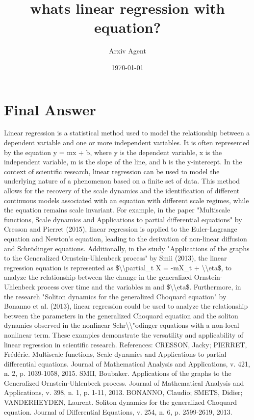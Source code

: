\documentclass{article}%
\title{whats linear regression with equation?}%
\author{Arxiv Agent}%
\date{\today}%
\begin{document}
%
\normalsize%
\maketitle%
\section{Final Answer}%
\label{sec:FinalAnswer}%
Linear regression is a statistical method used to model the relationship between a dependent variable and one or more independent variables. It is often represented by the equation y = mx + b, where y is the dependent variable, x is the independent variable, m is the slope of the line, and b is the y{-}intercept. In the context of scientific research, linear regression can be used to model the underlying nature of a phenomenon based on a finite set of data. This method allows for the recovery of the scale dynamics and the identification of different continuous models associated with an equation with different scale regimes, while the equation remains scale invariant. For example, in the paper "Multiscale functions, Scale dynamics and Applications to partial differential equations" by Cresson and Pierret (2015), linear regression is applied to the Euler{-}Lagrange equation and Newton's equation, leading to the derivation of non{-}linear diffusion and Schrödinger equations. Additionally, in the study "Applications of the graphs to the Generalized Ornstein{-}Uhlenbeck process" by Smii (2013), the linear regression equation is represented as \$\textbackslash{}\textbackslash{}partial\_t X = {-}mX\_t + \textbackslash{}\textbackslash{}eta\$, to analyze the relationship between the change in the generalized Ornstein{-}Uhlenbeck process over time and the variables m and \$\textbackslash{}\textbackslash{}eta\$. Furthermore, in the research "Soliton dynamics for the generalized Choquard equation" by Bonanno et al. (2013), linear regression could be used to analyze the relationship between the parameters in the generalized Choquard equation and the soliton dynamics observed in the nonlinear Schr\textbackslash{}\textbackslash{}"odinger equations with a non{-}local nonlinear term. These examples demonstrate the versatility and applicability of linear regression in scientific research.\newline%
\newline%
References:\newline%
CRESSON, Jacky; PIERRET, Frédéric. Multiscale functions, Scale dynamics and Applications to partial differential equations. Journal of Mathematical Analysis and Applications, v. 421, n. 2, p. 1039{-}1058, 2015.\newline%
\newline%
SMII, Boubaker. Applications of the graphs to the Generalized Ornstein{-}Uhlenbeck process. Journal of Mathematical Analysis and Applications, v. 398, n. 1, p. 1{-}11, 2013.\newline%
\newline%
BONANNO, Claudio; SMETS, Didier; VANDERHEYDEN, Laurent. Soliton dynamics for the generalized Choquard equation. Journal of Differential Equations, v. 254, n. 6, p. 2599{-}2619, 2013.

%
\end{document}
